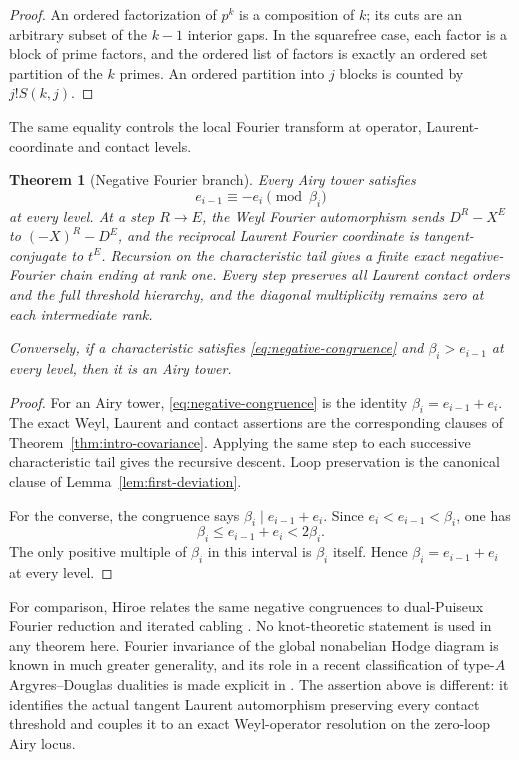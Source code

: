 \documentclass[11pt,a4paper]{amsart}
\theoremstyle{plain}
\newtheorem{theorem}{Theorem}[section]
\theoremstyle{definition}
\begin{document}
\begin{proof}
An ordered factorization of $p^k$ is a composition of $k$; its cuts are an arbitrary subset of the
$k-1$ interior gaps.  In the squarefree case, each factor is a block of prime factors, and the
ordered list of factors is exactly an ordered set partition of the $k$ primes.  An ordered
partition into $j$ blocks is counted by $j!S(k,j)$.
\end{proof}

The same equality controls the local Fourier transform at operator, Laurent-coordinate and contact
levels.

\begin{theorem}[Negative Fourier branch]\label{thm:fourier}
Every Airy tower satisfies
\begin{equation}\label{eq:negative-congruence}
 e_{i-1}\equiv-e_i\pmod{\beta_i}
\end{equation}
at every level.  At a step $R\to E$, the Weyl Fourier automorphism sends
$D^R-X^E$ to $(-X)^R-D^E$, and the reciprocal Laurent Fourier coordinate is tangent-conjugate to
$t^E$.  Recursion on the characteristic tail gives a finite exact negative-Fourier chain ending at
rank one.  Every step preserves all Laurent contact orders and the full threshold hierarchy, and
the diagonal multiplicity remains zero at each intermediate rank.

Conversely, if a characteristic satisfies \eqref{eq:negative-congruence} and
$\beta_i>e_{i-1}$ at every level, then it is an Airy tower.
\end{theorem}

\begin{proof}
For an Airy tower, \eqref{eq:negative-congruence} is the identity
$\beta_i=e_{i-1}+e_i$.  The exact Weyl, Laurent and contact assertions are the corresponding clauses
of Theorem~\ref{thm:intro-covariance}.  Applying the same step to each successive characteristic
tail gives the recursive descent.  Loop preservation is the canonical clause of
Lemma~\ref{lem:first-deviation}.

For the converse, the congruence says $\beta_i\mid e_{i-1}+e_i$.  Since
$e_i<e_{i-1}<\beta_i$, one has
\[
 \beta_i\le e_{i-1}+e_i<2\beta_i.
\]
The only positive multiple of $\beta_i$ in this interval is $\beta_i$ itself.  Hence
$\beta_i=e_{i-1}+e_i$ at every level.
\end{proof}

For comparison, Hiroe relates the same negative congruences to dual-Puiseux Fourier reduction and
iterated cabling \cite{Hiroe2017}.  No knot-theoretic statement is used in any theorem here.
Fourier invariance of the global nonabelian Hodge diagram is known in much greater generality, and
its role in a recent classification of type-$A$ Argyres--Douglas dualities is made explicit in
\cite{Doucot2026Fourier}.  The assertion above is different: it identifies the actual tangent
Laurent automorphism preserving every contact threshold and couples it to an exact Weyl-operator
resolution on the zero-loop Airy locus.
\end{document}

